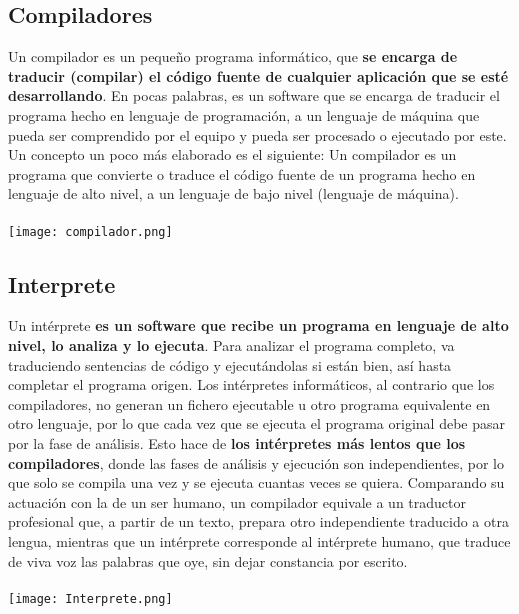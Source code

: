 \documentclass{article}
\begin{document}
\subsection{Compiladores}
Un compilador es un pequeño programa informático, que \textbf{se encarga de traducir (compilar) el código fuente de cualquier aplicación que se esté desarrollando}. En pocas palabras, es un software que se encarga de traducir el programa 
hecho en lenguaje de programación, a un lenguaje de máquina que pueda ser comprendido por el equipo y pueda ser procesado o ejecutado por este. Un concepto un poco más elaborado es el siguiente: Un compilador es un programa que 
convierte o traduce el código fuente de un programa hecho en lenguaje de alto nivel, a un lenguaje de bajo nivel (lenguaje de máquina).
\\
\\
\texttt{[image: compilador.png]}

\newpage
\subsection{Interprete}
Un intérprete \textbf{es un software que recibe un programa en lenguaje de alto nivel, lo analiza y lo ejecuta}. Para analizar el programa completo, va traduciendo sentencias de código y ejecutándolas si están bien, así hasta completar el programa origen.
Los intérpretes informáticos, al contrario que los compiladores, no generan un fichero ejecutable u otro programa equivalente en otro lenguaje, por lo que cada vez que se ejecuta el programa original debe pasar por la fase de análisis. Esto hace 
de \textbf{los intérpretes más lentos que los compiladores}, donde las fases de análisis y ejecución son independientes, por lo que solo se compila una vez y se ejecuta cuantas veces se quiera. Comparando su actuación con la de un ser humano, un compilador 
equivale a un traductor profesional que, a partir de un texto, prepara otro independiente traducido a otra lengua, mientras que un intérprete corresponde al intérprete humano, que traduce de viva voz las palabras que oye, sin dejar constancia por escrito. 
\\
\\
\texttt{[image: Interprete.png]}
\end{document}
